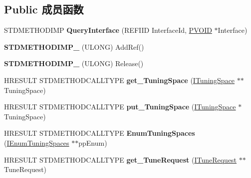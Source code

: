 \subsection*{Public 成员函数}
\begin{DoxyCompactItemize}
\item 
\mbox{\label{class_c_scanning_tunner_ab18705dbd873a854214882321f0be0a5}} 
S\+T\+D\+M\+E\+T\+H\+O\+D\+I\+MP {\bfseries Query\+Interface} (R\+E\+F\+I\+ID Interface\+Id, \hyperlink{interfacevoid}{P\+V\+O\+ID} $\ast$Interface)
\item 
\mbox{\label{class_c_scanning_tunner_a3f72a20b16c7cd1bb710a3f90afb1be1}} 
{\bfseries S\+T\+D\+M\+E\+T\+H\+O\+D\+I\+M\+P\+\_\+} (U\+L\+O\+NG) Add\+Ref()
\item 
\mbox{\label{class_c_scanning_tunner_a4bcf0ec2254d342479ea5448f54456b6}} 
{\bfseries S\+T\+D\+M\+E\+T\+H\+O\+D\+I\+M\+P\+\_\+} (U\+L\+O\+NG) Release()
\item 
\mbox{\label{class_c_scanning_tunner_ae5c9787362c1843278ebed62e6f925aa}} 
H\+R\+E\+S\+U\+LT S\+T\+D\+M\+E\+T\+H\+O\+D\+C\+A\+L\+L\+T\+Y\+PE {\bfseries get\+\_\+\+Tuning\+Space} (\hyperlink{interface_i_tuning_space}{I\+Tuning\+Space} $\ast$$\ast$Tuning\+Space)
\item 
\mbox{\label{class_c_scanning_tunner_a857d89d1b5f557a8f256db7e9e8fde9d}} 
H\+R\+E\+S\+U\+LT S\+T\+D\+M\+E\+T\+H\+O\+D\+C\+A\+L\+L\+T\+Y\+PE {\bfseries put\+\_\+\+Tuning\+Space} (\hyperlink{interface_i_tuning_space}{I\+Tuning\+Space} $\ast$Tuning\+Space)
\item 
\mbox{\label{class_c_scanning_tunner_a1fda22d17d75707ac2dd15285318e131}} 
H\+R\+E\+S\+U\+LT S\+T\+D\+M\+E\+T\+H\+O\+D\+C\+A\+L\+L\+T\+Y\+PE {\bfseries Enum\+Tuning\+Spaces} (\hyperlink{interface_i_enum_tuning_spaces}{I\+Enum\+Tuning\+Spaces} $\ast$$\ast$pp\+Enum)
\item 
\mbox{\label{class_c_scanning_tunner_afdd115f8f0d3ab92279be9a7a3943e72}} 
H\+R\+E\+S\+U\+LT S\+T\+D\+M\+E\+T\+H\+O\+D\+C\+A\+L\+L\+T\+Y\+PE {\bfseries get\+\_\+\+Tune\+Request} (\hyperlink{interface_i_tune_request}{I\+Tune\+Request} $\ast$$\ast$Tune\+Request)
$$
\end{DoxyCompactItemize}
